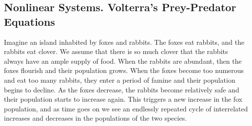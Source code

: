 \documentclass[11pt,a4paper]{article}
\begin{document}
\subsection{Nonlinear Systems. Volterra's Prey-Predator Equations}
\cite{george1991differential, simmons2016differential} Imagine an island inhabited by foxes and rabbits. The foxes eat rabbits, and the rabbits eat clover. We assume that there is so much clover that the rabbits always have an ample supply of food. When the rabbits are abundant, then the foxes flourish and their population grows. When the foxes become too numerous and eat too many rabbits, they enter a period of famine and their population begins to decline. As the foxes decrease, the rabbits become relatively safe and their population starts to increase again. This triggers a new increase in the fox population, and as time goes on we see an endlessly repeated cycle of interrelated increases and decreases in the populations of the two species. 
\end{document}
